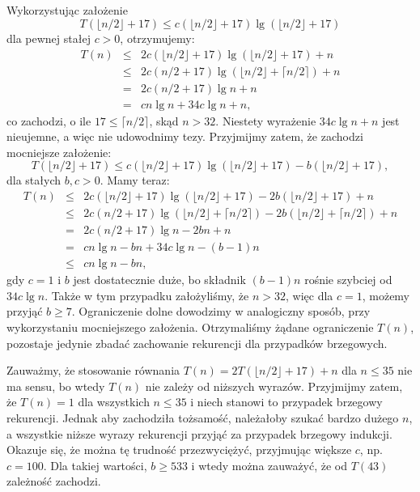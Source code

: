 \subsection{} %
Wykorzystując założenie
\[
	T(\lfloor n/2\rfloor+17)\le c(\lfloor n/2\rfloor+17)\lg(\lfloor n/2\rfloor+17)
\]
dla pewnej stałej $c>0$, otrzymujemy:
\begin{eqnarray*}
	T(n) &\le& 2c(\lfloor n/2\rfloor+17)\lg(\lfloor n/2\rfloor+17)+n \\
	&\le& 2c(n/2+17)\lg(\lfloor n/2\rfloor+\lceil n/2\rceil)+n \\
	&=& 2c(n/2+17)\lg n+n \\
	&=& cn\lg n+34c\lg n+n,
\end{eqnarray*}
co zachodzi, o ile $17\le\lceil n/2\rceil$, skąd $n>32$. Niestety wyrażenie $34c\lg n+n$ jest nieujemne, a więc nie udowodnimy tezy. Przyjmijmy zatem, że zachodzi mocniejsze założenie:
\[
	T(\lfloor n/2\rfloor+17)\le c(\lfloor n/2\rfloor+17)\lg(\lfloor n/2\rfloor+17)-b(\lfloor n/2\rfloor+17),
\]
dla stałych $b,c>0$. Mamy teraz:
\begin{eqnarray*}
	T(n) &\le& 2c(\lfloor n/2\rfloor+17)\lg(\lfloor n/2\rfloor+17)-2b(\lfloor n/2\rfloor+17)+n \\
	&\le& 2c(n/2+17)\lg(\lfloor n/2\rfloor+\lceil n/2\rceil)-2b(\lfloor n/2\rfloor+\lceil n/2\rceil)+n \\
	&=& 2c(n/2+17)\lg n-2bn+n \\
	&=& cn\lg n-bn+34c\lg n-(b-1)n \\
	&\le& cn\lg n-bn,
\end{eqnarray*}
gdy $c=1$ i $b$ jest dostatecznie duże, bo składnik $(b-1)n$ rośnie szybciej od $34c\lg n$. Także w tym przypadku założyliśmy, że $n>32$, więc dla $c=1$, możemy przyjąć $b\ge 7$. Ograniczenie dolne dowodzimy w analogiczny sposób, przy wykorzystaniu mocniejszego założenia. Otrzymaliśmy żądane ograniczenie $T(n)$, pozostaje jedynie zbadać zachowanie rekurencji dla przypadków brzegowych.

Zauważmy, że stosowanie równania $T(n)=2T(\lfloor n/2\rfloor+17)+n$ dla $n\le 35$ nie ma sensu, bo wtedy $T(n)$ nie zależy od niższych wyrazów. Przyjmijmy zatem, że $T(n)=1$ dla wszystkich $n\le 35$ i niech stanowi to przypadek brzegowy rekurencji. Jednak aby zachodziła tożsamość, należałoby szukać bardzo dużego $n$, a wszystkie niższe wyrazy rekurencji przyjąć za przypadek brzegowy indukcji. Okazuje się, że można tę trudność przezwyciężyć, przyjmując większe $c$, np. $c=100$. Dla takiej wartości, $b\ge 533$ i wtedy można zauważyć, że od $T(43)$ zależność zachodzi.

